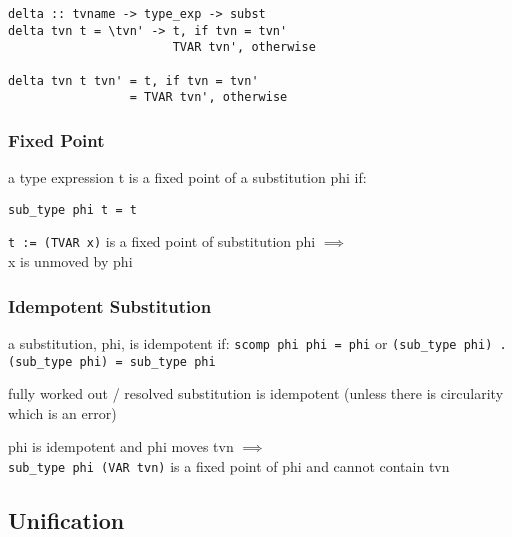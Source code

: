 \documentclass[8pt]{extarticle}
\begin{document}
\begin{multicols*}{2}
\begin{verbatim}
delta :: tvname -> type_exp -> subst
delta tvn t = \tvn' -> t, if tvn = tvn'
                       TVAR tvn', otherwise

delta tvn t tvn' = t, if tvn = tvn'
                 = TVAR tvn', otherwise
\end{verbatim}

\subsubsection{Fixed Point}

a type expression t is a fixed point of a substitution phi if:
\begin{verbatim}
sub_type phi t = t
\end{verbatim}

\verb|t := (TVAR x)| is a fixed point of substitution phi $\implies$\\
x is unmoved by phi

\subsubsection{Idempotent Substitution}
a substitution, phi, is idempotent if:
\verb|scomp phi phi = phi| or 
\verb|(sub_type phi) . (sub_type phi) = sub_type phi|

fully worked out / resolved substitution is idempotent (unless there is circularity which is an error)

phi is idempotent and phi moves tvn $\implies$\\
\verb|sub_type phi (VAR tvn)| is a fixed point of phi and cannot contain tvn

\vfill\null
\columnbreak

\subsection{Unification}


\end{multicols*}
\end{document}

